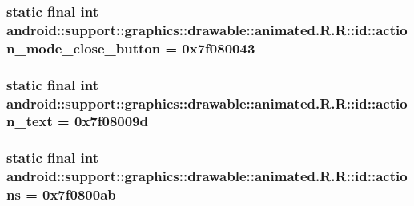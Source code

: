 \hypertarget{classandroid_1_1support_1_1graphics_1_1drawable_1_1animated_1_1_r_1_1id_e26155aa6127c15ef66a660616b4443a}{
\subsubsection[{action\_\-mode\_\-close\_\-button}]{\setlength{\rightskip}{0pt plus 5cm}static final int android::support::graphics::drawable::animated.R.R::id::action\_\-mode\_\-close\_\-button = 0x7f080043}}
\label{classandroid_1_1support_1_1graphics_1_1drawable_1_1animated_1_1_r_1_1id_e26155aa6127c15ef66a660616b4443a}


\hypertarget{classandroid_1_1support_1_1graphics_1_1drawable_1_1animated_1_1_r_1_1id_af4ed3c42714c936a76a6e436324330c}{
\subsubsection[{action\_\-text}]{\setlength{\rightskip}{0pt plus 5cm}static final int android::support::graphics::drawable::animated.R.R::id::action\_\-text = 0x7f08009d}}
\label{classandroid_1_1support_1_1graphics_1_1drawable_1_1animated_1_1_r_1_1id_af4ed3c42714c936a76a6e436324330c}


\hypertarget{classandroid_1_1support_1_1graphics_1_1drawable_1_1animated_1_1_r_1_1id_d95f30cc6ab261960414072a50eb8df1}{
\subsubsection[{actions}]{\setlength{\rightskip}{0pt plus 5cm}static final int android::support::graphics::drawable::animated.R.R::id::actions = 0x7f0800ab}}
\label{classandroid_1_1support_1_1graphics_1_1drawable_1_1animated_1_1_r_1_1id_d95f30cc6ab261960414072a50eb8df1}


